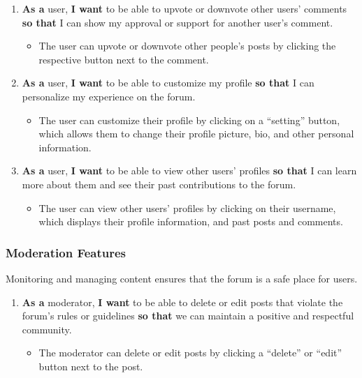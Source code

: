 \documentclass[10pt]{exam}
\providecommand{\tightlist}{%
  \setlength{\itemsep}{0pt}\setlength{\parskip}{0pt}}
\begin{document}
\begin{enumerate}
\def\labelenumi{\arabic{enumi}.}
\tightlist
\item
  \textbf{As a} user, \textbf{I want} to be able to upvote or downvote
  other users' comments \textbf{so that} I can show my approval or
  support for another user's comment.

  \begin{itemize}
  \tightlist
  \item
    The user can upvote or downvote other people's posts by clicking the
    respective button next to the comment.
  \end{itemize}
\item
  \textbf{As a} user, \textbf{I want} to be able to customize my profile
  \textbf{so that} I can personalize my experience on the forum.

  \begin{itemize}
  \tightlist
  \item
    The user can customize their profile by clicking on a ``setting''
    button, which allows them to change their profile picture, bio, and
    other personal information.
  \end{itemize}
\item
  \textbf{As a} user, \textbf{I want} to be able to view other users'
  profiles \textbf{so that} I can learn more about them and see their
  past contributions to the forum.

  \begin{itemize}
  \tightlist
  \item
    The user can view other users' profiles by clicking on their
    username, which displays their profile information, and past posts
    and comments.
  \end{itemize}
\end{enumerate}

\hypertarget{moderation-features}{%
\subsubsection{Moderation Features}\label{moderation-features}}

Monitoring and managing content ensures that the forum is a safe place
for users.

\begin{enumerate}
\def\labelenumi{\arabic{enumi}.}
\tightlist
\item
  \textbf{As a} moderator, \textbf{I want} to be able to delete or edit
  posts that violate the forum's rules or guidelines \textbf{so that} we
  can maintain a positive and respectful community.

  \begin{itemize}
  \tightlist
  \item
    The moderator can delete or edit posts by clicking a ``delete'' or
    ``edit'' button next to the post.
  \end{itemize}
\end{enumerate}
\end{document}
